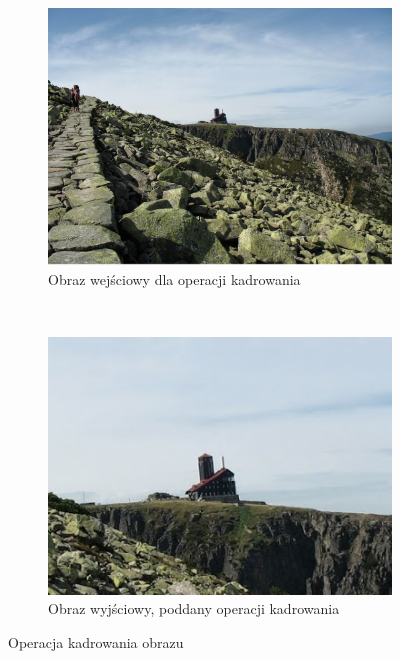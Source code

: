 \begin{figure}
  \centering
  \begin{subfigure}[b]{0.45\textwidth}
    \includegraphics[width=\textwidth]{img/crop-image-before}
    \caption{Obraz wejściowy dla operacji kadrowania}
    \label{fig:crop_image_before}
  \end{subfigure}
  ~
  \begin{subfigure}[b]{0.45\textwidth}
    \includegraphics[width=\textwidth]{img/crop-image-after}
    \caption{Obraz wyjściowy, poddany operacji kadrowania}
    \label{fig:crop_image_after}
  \end{subfigure}
  \caption{Operacja kadrowania obrazu}\label{fig:crop_image}
\end{figure}
